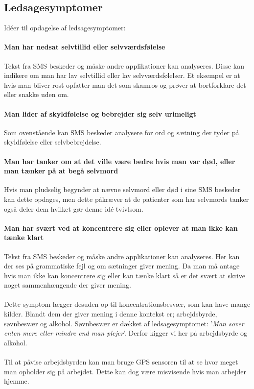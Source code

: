 \subsection{Ledsagesymptomer}\label{depr_ledsage}
Idéer til opdagelse af ledsagesymptomer:
\paragraph{Man har nedsat selvtillid eller selvværdsfølelse}
Tekst fra SMS beskeder og måske andre applikationer kan analyseres. Disse kan indikere om man har lav selvtillid eller lav selvværdsfølelser. Et eksempel er at hvis man bliver rost opfatter man det som skamros og prøver at bortforklare det eller snakke uden om.\cite{selvtillid}

\paragraph{Man lider af skyldfølelse og bebrejder sig selv urimeligt}
Som ovenstående kan SMS beskeder analysere for ord og sætning der tyder på skyldfølelse eller selvbebrejdelse.

\paragraph{Man har tanker om at det ville være bedre hvis man var død, eller man tænker på at begå selvmord}
Hvis man pludselig begynder at nævne selvmord eller død i sine SMS beskeder kan dette opdages, men dette påkræver at de patienter som har selvmords tanker også deler dem hvilket gør denne idé tvivlsom.

\paragraph{Man har svært ved at koncentrere sig eller oplever at man ikke kan tænke klart}
Tekst fra SMS beskeder og måske andre applikationer kan analyseres. Her kan der ses på grammatiske fejl og om sætninger giver mening. Da man må antage hvis man ikke kan koncentrere sig eller kan tænke klart så er det svært at skrive noget sammenhængende der giver mening.
\\
\\
Dette symptom lægger desuden op til koncentrationsbesvær, som kan have mange kilder. Blandt dem der giver mening i denne kontekst er; arbejdsbyrde, søvnbesvær og alkohol.\cite{koncentration}
Søvnbesvær er dækket af ledsagesymptomet: '\textit{Man sover enten mere eller mindre end man plejer}'. Derfor kigger vi her på arbejdsbyrde og alkohol.
\\
\\
Til at påvise arbejdsbyrden kan man bruge GPS sensoren til at se hvor meget man opholder sig på arbejdet. Dette kan dog være misvisende hvis man arbejder hjemme.

